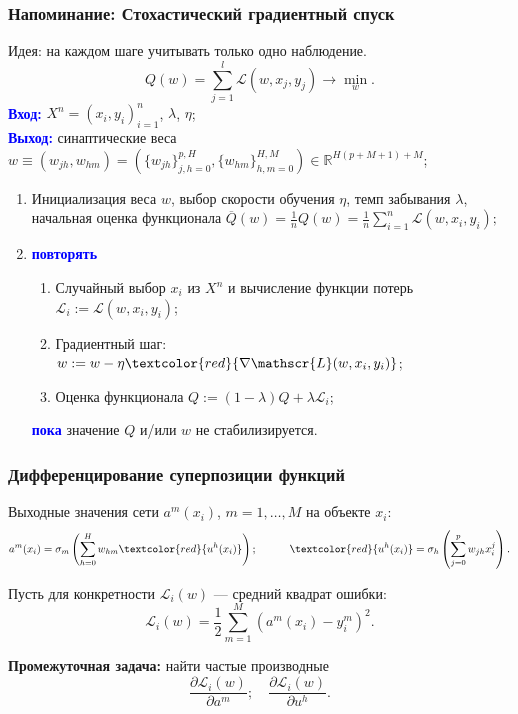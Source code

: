 \documentclass[unicode, notheorems]{beamer}
\begin{document}
\begin{frame}
	\frametitle{Напоминание: Стохастический градиентный спуск}
Идея: на каждом шаге учитывать только одно наблюдение. \\
	\[
Q(w)=\sum_{j=1}^{l} \mathscr{L} \left(  w,x_j, y_j \right) \rightarrow \min_{w}.
\]
\textcolor{blue}{\bfseries Вход:} $X^n = (x_i, y_i)_{i=1}^{n}$, $\lambda$, $\eta$;\\
\textcolor{blue}{\bfseries Выход:} синаптические веса $w \equiv (w_{jh}, w_{hm}) = (\{ w_{jh}\}_{j,h=0}^{p,H}, \{w_{hm}\}_{h,m=0}^{H,M}) \in \mathbb{R}^{H(p+M+1) + M}$;\\
\begin{enumerate}
	\item Инициализация веса $w$, выбор скорости обучения $\eta$, темп забывания $\lambda$, начальная оценка функционала 
$\overline{Q}(w)=\frac{1}{n} Q(w)=\frac{1}{n} \sum_{i=1}^n \mathscr{L}(w,x_i,y_i);$
\item \textcolor{blue}{\bfseries повторять}
\begin{enumerate}
	\item Случайный выбор $x_i$ из $X^n$ и вычисление функции потерь $\mathscr{L}_i:=\mathscr{L}(w,x_i,y_i)$;
	\item Градиентный шаг: $w:=w- \eta \textcolor{red}{\nabla \mathscr{L}(w,x_i,y_i)}$;
	\item Оценка функционала $Q :=(1-\lambda)Q+\lambda \mathscr{L}_i$;
\end{enumerate}	
\textcolor{blue}{\bfseries пока} значение $Q$ и/или $w$ не стабилизируется.
\end{enumerate}		
\end{frame}


\begin{frame}
	\frametitle{Дифференцирование суперпозиции функций}
	Выходные значения сети $a^m(x_i)$, $m=1,\ldots,M$ на объекте $x_i$:
	\[
	a^m(x_i) = \sigma_m \left(\sum_{h=0}^{H} w_{hm}  \textcolor{red}{ u^h(x_i)}  \right); \quad \quad \quad 
	\textcolor{red}{ u^h(x_i)} = \sigma_h \left(\sum_{j=0}^{p} w_{jh} x_{i}^j   \right).
	\]

	Пусть для конкретности $\mathscr{L}_i(w)$ --- средний квадрат ошибки:
	\[
	\mathscr{L}_i(w) = \frac{1}{2} \sum_{m=1}^{M}(a^m(x_i) - y^m_i)^2.
	\]
	
	\textbf{Промежуточная задача:} найти частые производные 
	\[
	\frac{\partial \mathscr{L}_i(w)}{\partial a^m}; \quad \frac{\partial \mathscr{L}_i(w)}{\partial u^h}.
	\]
\end{frame} 
\end{document}
